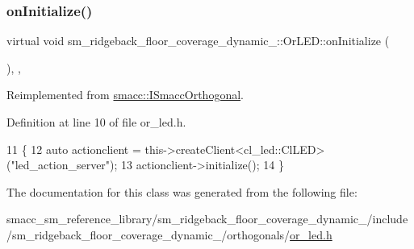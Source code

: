 \subsubsection{\texorpdfstring{on\+Initialize()}{onInitialize()}}
{\footnotesize\ttfamily virtual void sm\+\_\+ridgeback\+\_\+floor\+\_\+coverage\+\_\+dynamic\+\_\+::\+Or\+L\+E\+D\+::on\+Initialize (\begin{DoxyParamCaption}{ }\end{DoxyParamCaption})\hspace{0.3cm}{\ttfamily [inline]}, {\ttfamily [override]}, {\ttfamily [virtual]}}



Reimplemented from \hyperlink{classsmacc_1_1ISmaccOrthogonal_a6bb31c620cb64dd7b8417f8705c79c7a}{smacc\+::\+I\+Smacc\+Orthogonal}.



Definition at line 10 of file or\+\_\+led.\+h.


\begin{DoxyCode}
11     \{
12         \textcolor{keyword}{auto} actionclient = this->createClient<cl\_led::ClLED>(\textcolor{stringliteral}{"led\_action\_server"});
13         actionclient->initialize();
14     \}
\end{DoxyCode}


The documentation for this class was generated from the following file\+:\begin{DoxyCompactItemize}
\item 
smacc\+\_\+sm\+\_\+reference\+\_\+library/sm\+\_\+ridgeback\+\_\+floor\+\_\+coverage\+\_\+dynamic\+\_/include/sm\+\_\+ridgeback\+\_\+floor\+\_\+coverage\+\_\+dynamic\+\_/orthogonals/\hyperlink{sm__ridgeback__floor__coverage__dynamic__1_2include_2sm__ridgeback__floor__coverage__dynamic__1_2orthogonals_2or__led_8h}{or\+\_\+led.\+h}\end{DoxyCompactItemize}
